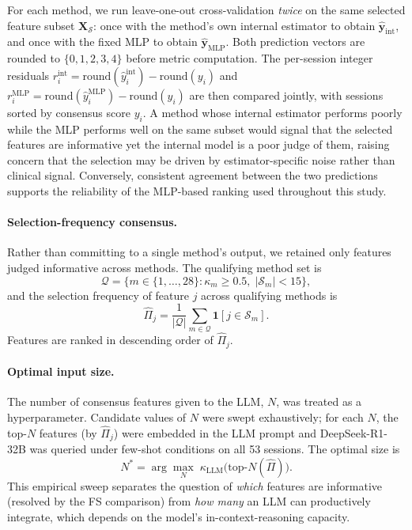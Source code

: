 \documentclass[conference]{IEEEtran}
\begin{document}
For each method, we run leave-one-out cross-validation \emph{twice} on the same selected
feature subset $\mathbf{X}_{\mathcal{S}}$: once with the method's own internal estimator
to obtain $\hat{\mathbf{y}}_{\mathrm{int}}$, and once with the fixed MLP to obtain
$\hat{\mathbf{y}}_{\mathrm{MLP}}$.
Both prediction vectors are rounded to $\{0,1,2,3,4\}$ before metric computation.
The per-session integer residuals
$r_i^{\mathrm{int}} = \mathrm{round}(\hat{y}_i^{\mathrm{int}}) - \mathrm{round}(y_i)$
and $r_i^{\mathrm{MLP}} = \mathrm{round}(\hat{y}_i^{\mathrm{MLP}}) - \mathrm{round}(y_i)$
are then compared jointly, with sessions sorted by consensus score $y_i$.
A method whose internal estimator performs poorly while the MLP performs well on the
same subset would signal that the selected features are informative yet the internal model
is a poor judge of them, raising concern that the selection may be driven by estimator-specific
noise rather than clinical signal.
Conversely, consistent agreement between the two predictions supports the reliability of the
MLP-based ranking used throughout this study.

\paragraph{Selection-frequency consensus.}
Rather than committing to a single method's output, we retained only features judged
informative across methods.
The qualifying method set is
\begin{equation}
    \mathcal{Q} = \bigl\{m \in \{1,\ldots,28\} : \kappa_m \geq 0.5,\;
        |\mathcal{S}_m| < 15\bigr\},
    \label{eq:qualify}
\end{equation}
and the selection frequency of feature $j$ across qualifying methods is
\begin{equation}
    \hat{\Pi}_j = \frac{1}{|\mathcal{Q}|}
        \sum_{m \in \mathcal{Q}} \mathbf{1}[j \in \mathcal{S}_m].
    \label{eq:freq}
\end{equation}
Features are ranked in descending order of $\hat{\Pi}_j$.

\paragraph{Optimal input size.}
The number of consensus features given to the LLM, $N$, was treated as a
hyperparameter.
Candidate values of $N$ were swept exhaustively; for each $N$, the top-$N$ features
(by $\hat{\Pi}_j$) were embedded in the LLM prompt and DeepSeek-R1-32B was queried
under few-shot conditions on all 53 sessions.
The optimal size is
\begin{equation}
    N^{*} = \arg\max_{N}\;
        \kappa_{\mathrm{LLM}}\!\bigl(\mathrm{top}\text{-}N(\hat{\Pi})\bigr).
    \label{eq:nstar}
\end{equation}
This empirical sweep separates the question of \emph{which} features are informative
(resolved by the FS comparison) from \emph{how many} an LLM can productively integrate,
which depends on the model's in-context-reasoning capacity.
\end{document}
